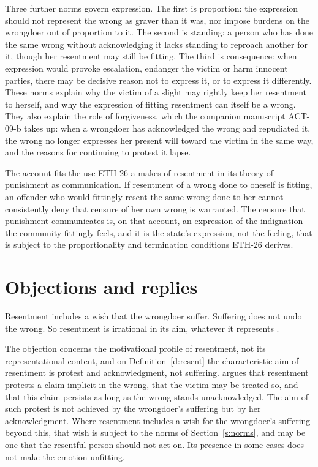 \documentclass{situationist-preprint}
\begin{document}
Three further norms govern expression. The first is proportion: the expression should not represent the wrong as graver than it was, nor impose burdens on the wrongdoer out of proportion to it. The second is standing: a person who has done the same wrong without acknowledging it lacks standing to reproach another for it, though her resentment may still be fitting. The third is consequence: when expression would provoke escalation, endanger the victim or harm innocent parties, there may be decisive reason not to express it, or to express it differently. These norms explain why the victim of a slight may rightly keep her resentment to herself, and why the expression of fitting resentment can itself be a wrong. They also explain the role of forgiveness, which the companion manuscript ACT-09-b takes up: when a wrongdoer has acknowledged the wrong and repudiated it, the wrong no longer expresses her present will toward the victim in the same way, and the reasons for continuing to protest it lapse.

The account fits the use ETH-26-a makes of resentment in its theory of punishment as communication. If resentment of a wrong done to oneself is fitting, an offender who would fittingly resent the same wrong done to her cannot consistently deny that censure of her own wrong is warranted. The censure that punishment communicates is, on that account, an expression of the indignation the community fittingly feels, and it is the state's expression, not the feeling, that is subject to the proportionality and termination conditions ETH-26 derives.

\section{Objections and replies}

\begin{objection}[Payback]
Resentment includes a wish that the wrongdoer suffer. Suffering does not undo the wrong. So resentment is irrational in its aim, whatever it represents \citep{Nussbaum2016}.
\end{objection}

\begin{reply}
The objection concerns the motivational profile of resentment, not its representational content, and on Definition~\ref{d:resent} the characteristic aim of resentment is protest and acknowledgment, not suffering. \citet{Hieronymi2001} argues that resentment protests a claim implicit in the wrong, that the victim may be treated so, and that this claim persists as long as the wrong stands unacknowledged. The aim of such protest is not achieved by the wrongdoer's suffering but by her acknowledgment. Where resentment includes a wish for the wrongdoer's suffering beyond this, that wish is subject to the norms of Section~\ref{s:norms}, and may be one that the resentful person should not act on. Its presence in some cases does not make the emotion unfitting.
\end{reply}
\end{document}
